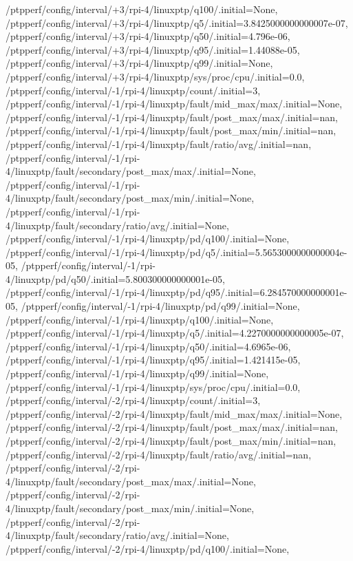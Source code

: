 {    /ptpperf/config/interval/+3/rpi-4/linuxptp/q100/.initial=None,
    /ptpperf/config/interval/+3/rpi-4/linuxptp/q5/.initial=3.8425000000000007e-07,
    /ptpperf/config/interval/+3/rpi-4/linuxptp/q50/.initial=4.796e-06,
    /ptpperf/config/interval/+3/rpi-4/linuxptp/q95/.initial=1.44088e-05,
    /ptpperf/config/interval/+3/rpi-4/linuxptp/q99/.initial=None,
    /ptpperf/config/interval/+3/rpi-4/linuxptp/sys/proc/cpu/.initial=0.0,
    /ptpperf/config/interval/-1/rpi-4/linuxptp/count/.initial=3,
    /ptpperf/config/interval/-1/rpi-4/linuxptp/fault/mid_max/max/.initial=None,
    /ptpperf/config/interval/-1/rpi-4/linuxptp/fault/post_max/max/.initial=nan,
    /ptpperf/config/interval/-1/rpi-4/linuxptp/fault/post_max/min/.initial=nan,
    /ptpperf/config/interval/-1/rpi-4/linuxptp/fault/ratio/avg/.initial=nan,
    /ptpperf/config/interval/-1/rpi-4/linuxptp/fault/secondary/post_max/max/.initial=None,
    /ptpperf/config/interval/-1/rpi-4/linuxptp/fault/secondary/post_max/min/.initial=None,
    /ptpperf/config/interval/-1/rpi-4/linuxptp/fault/secondary/ratio/avg/.initial=None,
    /ptpperf/config/interval/-1/rpi-4/linuxptp/pd/q100/.initial=None,
    /ptpperf/config/interval/-1/rpi-4/linuxptp/pd/q5/.initial=5.5653000000000004e-05,
    /ptpperf/config/interval/-1/rpi-4/linuxptp/pd/q50/.initial=5.800300000000001e-05,
    /ptpperf/config/interval/-1/rpi-4/linuxptp/pd/q95/.initial=6.284570000000001e-05,
    /ptpperf/config/interval/-1/rpi-4/linuxptp/pd/q99/.initial=None,
    /ptpperf/config/interval/-1/rpi-4/linuxptp/q100/.initial=None,
    /ptpperf/config/interval/-1/rpi-4/linuxptp/q5/.initial=4.2270000000000005e-07,
    /ptpperf/config/interval/-1/rpi-4/linuxptp/q50/.initial=4.6965e-06,
    /ptpperf/config/interval/-1/rpi-4/linuxptp/q95/.initial=1.421415e-05,
    /ptpperf/config/interval/-1/rpi-4/linuxptp/q99/.initial=None,
    /ptpperf/config/interval/-1/rpi-4/linuxptp/sys/proc/cpu/.initial=0.0,
    /ptpperf/config/interval/-2/rpi-4/linuxptp/count/.initial=3,
    /ptpperf/config/interval/-2/rpi-4/linuxptp/fault/mid_max/max/.initial=None,
    /ptpperf/config/interval/-2/rpi-4/linuxptp/fault/post_max/max/.initial=nan,
    /ptpperf/config/interval/-2/rpi-4/linuxptp/fault/post_max/min/.initial=nan,
    /ptpperf/config/interval/-2/rpi-4/linuxptp/fault/ratio/avg/.initial=nan,
    /ptpperf/config/interval/-2/rpi-4/linuxptp/fault/secondary/post_max/max/.initial=None,
    /ptpperf/config/interval/-2/rpi-4/linuxptp/fault/secondary/post_max/min/.initial=None,
    /ptpperf/config/interval/-2/rpi-4/linuxptp/fault/secondary/ratio/avg/.initial=None,
    /ptpperf/config/interval/-2/rpi-4/linuxptp/pd/q100/.initial=None,
}
